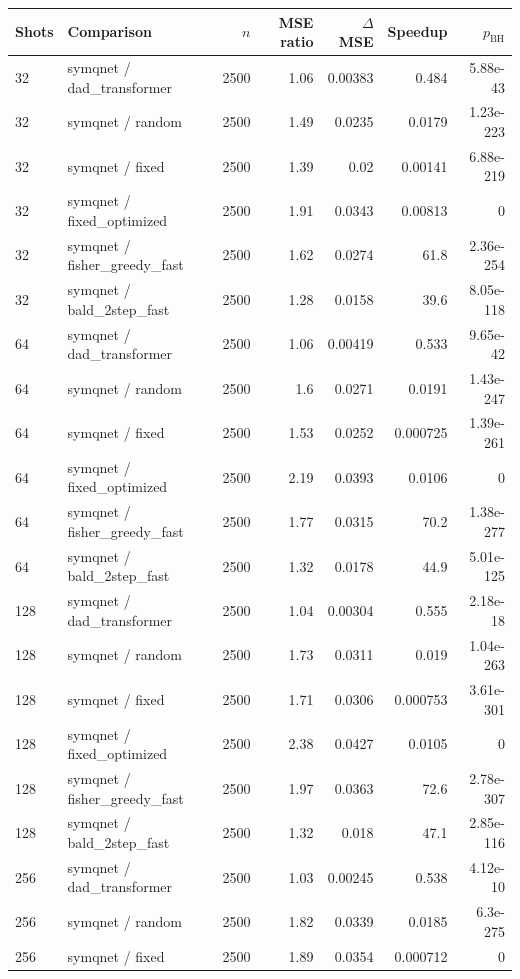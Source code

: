 \begin{tabular}{llrrrrr}
\toprule
Shots & Comparison & $n$ & MSE ratio & $\Delta$MSE & Speedup & $p_{\mathrm{BH}}$ \\
\midrule
32 & symqnet / dad\_transformer & 2500 & 1.06 & 0.00383 & 0.484 & 5.88e-43 \\
32 & symqnet / random & 2500 & 1.49 & 0.0235 & 0.0179 & 1.23e-223 \\
32 & symqnet / fixed & 2500 & 1.39 & 0.02 & 0.00141 & 6.88e-219 \\
32 & symqnet / fixed\_optimized & 2500 & 1.91 & 0.0343 & 0.00813 & 0 \\
32 & symqnet / fisher\_greedy\_fast & 2500 & 1.62 & 0.0274 & 61.8 & 2.36e-254 \\
32 & symqnet / bald\_2step\_fast & 2500 & 1.28 & 0.0158 & 39.6 & 8.05e-118 \\
64 & symqnet / dad\_transformer & 2500 & 1.06 & 0.00419 & 0.533 & 9.65e-42 \\
64 & symqnet / random & 2500 & 1.6 & 0.0271 & 0.0191 & 1.43e-247 \\
64 & symqnet / fixed & 2500 & 1.53 & 0.0252 & 0.000725 & 1.39e-261 \\
64 & symqnet / fixed\_optimized & 2500 & 2.19 & 0.0393 & 0.0106 & 0 \\
64 & symqnet / fisher\_greedy\_fast & 2500 & 1.77 & 0.0315 & 70.2 & 1.38e-277 \\
64 & symqnet / bald\_2step\_fast & 2500 & 1.32 & 0.0178 & 44.9 & 5.01e-125 \\
128 & symqnet / dad\_transformer & 2500 & 1.04 & 0.00304 & 0.555 & 2.18e-18 \\
128 & symqnet / random & 2500 & 1.73 & 0.0311 & 0.019 & 1.04e-263 \\
128 & symqnet / fixed & 2500 & 1.71 & 0.0306 & 0.000753 & 3.61e-301 \\
128 & symqnet / fixed\_optimized & 2500 & 2.38 & 0.0427 & 0.0105 & 0 \\
128 & symqnet / fisher\_greedy\_fast & 2500 & 1.97 & 0.0363 & 72.6 & 2.78e-307 \\
128 & symqnet / bald\_2step\_fast & 2500 & 1.32 & 0.018 & 47.1 & 2.85e-116 \\
256 & symqnet / dad\_transformer & 2500 & 1.03 & 0.00245 & 0.538 & 4.12e-10 \\
256 & symqnet / random & 2500 & 1.82 & 0.0339 & 0.0185 & 6.3e-275 \\
256 & symqnet / fixed & 2500 & 1.89 & 0.0354 & 0.000712 & 0 \\

\end{tabular}
